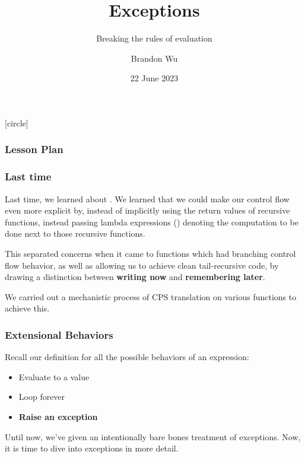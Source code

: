 \documentclass[aspectratio=169]{beamer}
\title{Exceptions} %
\subtitle{Breaking the rules of evaluation} %
\date{22 June 2023} %
\author{Brandon Wu} %
\newif\ifcolorlambda
\begin{document}
\ifweb
    \renewcommand{\pause}{}
\fi

[circle]

{
\begin{frame}[plain]
    \colorlambdatrue
    \titlepage
\end{frame}
}


\begin{frame}[fragile]
  \frametitle{Lesson Plan}

  \tableofcontents
\end{frame}

\begin{frame}[fragile]
  \frametitle{Last time}

  Last time, we learned about . We learned that
  we could make our control flow even more explicit by, instead of implicitly
  using the return values of recursive functions, instead passing lambda expressions
  () denoting the computation to be done next to those recursive functions.

  \pause
  \vspace{\fill}

  This separated concerns when it came to functions which had branching control
  flow behavior, as well as allowing us to achieve clean tail-recursive code,
  by drawing a distinction between \textbf{writing now} and \textbf{remembering later}.

  \pause
  \vspace{\fill}

  We carried out a mechanistic process of CPS translation on various functions to
  achieve this.
\end{frame}


\begin{frame}[fragile]
  \frametitle{Extensional Behaviors}

  Recall our definition for all the possible behaviors of an expression: \pause
  \begin{itemize}
    \item Evaluate to a value \pause
    \item Loop forever \pause
    \item \textbf{Raise an exception} 
  \end{itemize}

  \pause
  \vspace{\fill}

  Until now, we've given an intentionally bare bones treatment of 
  exceptions. Now, it is time to dive into exceptions in more detail. 
\end{frame}
\end{document}
